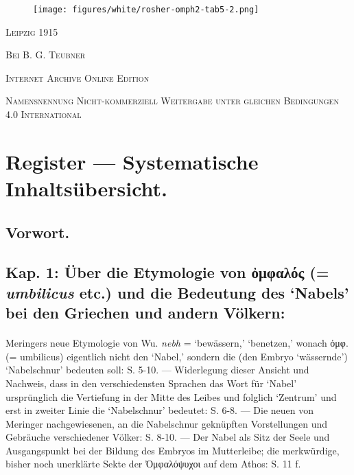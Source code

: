 \documentclass[a4paper, 11pt, oneside]{article}
\begin{document}
\begin{titlepage}
        \begin{figure}[H]
        \centering
        \texttt{[image: figures/white/rosher-omph2-tab5-2.png]}
        \end{figure}

	\vspace{1\baselineskip}

        \vspace*{\fill}

	{\small\scshape Leipzig 1915}
	
	{\small\scshape{Bei B. G. Teubner}}
 
	\vspace{0.5\baselineskip} %

        \scshape Internet Archive Online Edition  %
	
	{\scshape\small Namensnennung Nicht-kommerziell Weitergabe unter gleichen Bedingungen 4.0 International} %
\end{titlepage}
\setlength{\parskip}{1mm plus1mm minus1mm}
\clearpage
\pagestyle{fancy}
\fancyhf{}
\cfoot{\frakfamily{\thepage}}
\Large
\tableofcontents
\clearpage
\section*{Register --- Systematische Inhaltsübersicht.}
\subsection*{Vorwort.}
\subsection*{Kap. 1: Über die Etymologie von ὀμφαλός (= \emph{umbilicus} etc.) und die Bedeutung des `Nabels' bei den Griechen und andern Völkern:}
\paragraph{}
Meringers neue Etymologie von Wu. \emph{nebh} = `bewässern,' `benetzen,' wonach ὀμφ. (= umbilicus) eigentlich nicht den `Nabel,' sondern die (den Embryo `wässernde') `Nabelschnur' bedeuten soll: S. 5-10. --- Widerlegung dieser Ansicht und Nachweis, dass in den verschiedensten Sprachen das Wort für `Nabel' ursprünglich die Vertiefung in der Mitte des Leibes und folglich `Zentrum' und erst in zweiter Linie die `Nabelschnur' bedeutet: S. 6-8. --- Die neuen von Meringer nachgewiesenen, an die Nabelschnur geknüpften Vorstellungen und Gebräuche verschiedener Völker: S. 8-10. --- Der Nabel als Sitz der Seele und Ausgangspunkt bei der Bildung des Embryos im Mutterleibe; die merkwürdige, bisher noch unerklärte Sekte der Ὀμφαλόψυχοι auf dem Athos: S. 11 f.
\end{document}

